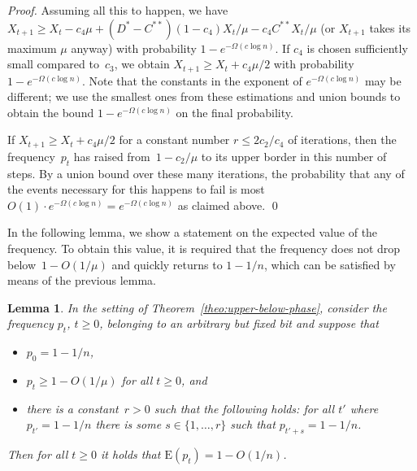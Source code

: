 \documentclass[11pt, a4paper]{article}
\newtheorem{lemma}{Lemma}
\newcommand*{\E}{\mathrm{E}}
\begin{document}
\begin{proof}
Assuming all 
this to happen, we have $X_{t+1}\ge X_t -c_4 \mu  + (D^*-C^{**}) (1-c_4) X_t/\mu - c_4 C^{**} X_t/\mu $ 
(or $X_{t+1}$ takes its maximum $\mu$ anyway) 
with probability $1-e^{-\Omega(c\log n)}$. If $c_4$ is chosen sufficiently 
small compared to~$c_3$, we obtain $X_{t+1}\ge X_t+ c_4\mu /2$ with probability 
$1-e^{-\Omega(c\log n)}$. Note that the constants in the exponent of $e^{-\Omega(c\log n)}$ 
may be different; we use the smallest ones from these estimations and union bounds 
to obtain the bound $1-e^{-\Omega(c\log n)}$ on the  final probability.

If $X_{t+1}\ge X_t+ c_4\mu /2$ for a constant number $r\le 2c_2/c_4$ of iterations, then 
the frequency~$p_t$ has raised from~$1-c_2/\mu$ to its upper border  in this number 
of steps. By a union bound over these many iterations, the probability 
that any of the events necessary for this happens to fail is most $O(1)\cdot e^{-\Omega(c\log n)}=e^{-\Omega(c\log n)}$ 
as claimed above.
\qed\end{proof}

In the following lemma, we show a statement on the expected value of the frequency.  
To obtain this value, it is required that the frequency does not drop below~$1-O(1/\mu)$ and 
quickly returns to $1-1/n$, 
which can be satisfied by means of the previous lemma. 


\begin{lemma}
\label{lem:markov-chain-analysis}
In the setting of Theorem~\ref{theo:upper-below-phase}, 
consider the frequency $p_t$, $t\ge 0$, belonging to an arbitrary but 
fixed bit and suppose that \begin{itemize}
\item $p_0=1-1/n$, 
\item $p_t\ge 1-O(1/\mu)$ for 
all $t\ge 0$, and
\item there is a constant~$r>0$ such that the following holds: 
for all $t'$ where $p_{t'}=1-1/n$ there is some $s\in\{1,\dots, r\}$ 
such that $p_{t'+s}=1-1/n$. 
\end{itemize}
 Then for all $t\ge 0$ it holds that  $\E(p_t) = 1-O(1/n)$.
\end{lemma}
\end{document}
